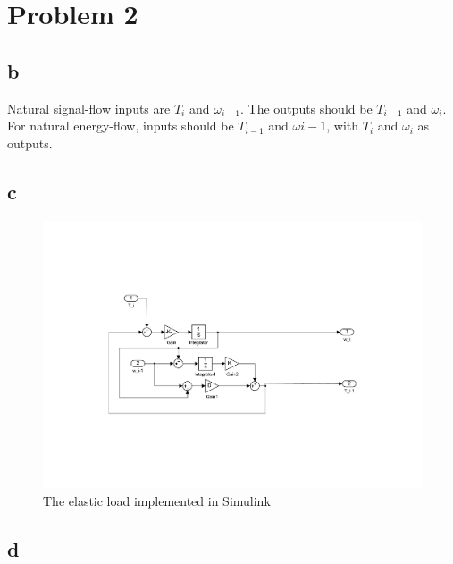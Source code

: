 \documentclass{article}
\begin{document}
\newpage
\section{Problem 2}

\subsection{b}

Natural signal-flow inputs are $T_i$ and $\omega_{i-1}$. The outputs should be $T_{i-1}$ and $\omega_i$. For natural energy-flow, inputs should be $T_{i-1}$ and $\omega{i-1}$, with $T_i$ and $\omega_i$ as outputs. 

\subsection{c}

\begin{figure}[!ht]
    \centering
    \includegraphics[width = \textwidth]{ex1_2_elasticload}
    \caption{The elastic load implemented in Simulink}
    \label{fig:elasticload} 
\end{figure}

\subsection{d}
\end{document}
